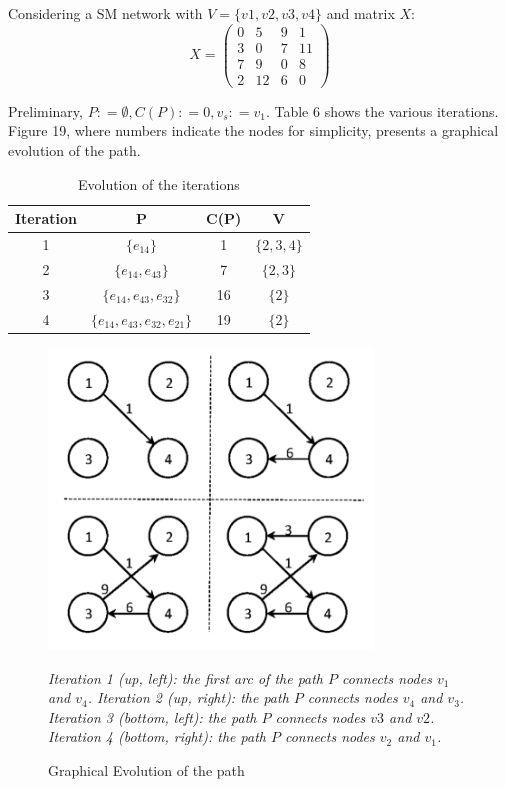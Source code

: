 Considering a SM network with $V = \{v1, v2, v3, v4\}$ and matrix $X$:
\begin{equation}
    \label{eq:x-matrix-sample-initialization}
    X = \begin{pmatrix} 0 & 5 & 9 & 1\\ 3 & 0 & 7 & 11\\ 7 & 9 & 0 & 8\\ 2 & 12 & 6 & 0 \end{pmatrix}
\end{equation}

Preliminary, $P : = \emptyset , C(P) : = 0, v_s : = v_1$. Table 6 shows the various iterations. Figure 19, where numbers indicate the nodes for simplicity, presents a graphical evolution of the path.
\begin{table}
    \centering
    \begin{tabular}{|c|c|c|c|}
        \hline
        \textbf{Iteration} & \textbf{P} & \textbf{C(P)} & \textbf{V} \\
        \hline
        1 & $\{e_{14}\}$ & 1 & $\{2,3,4\}$\\
        \hline
        2 & $\{e_{14}, e_{43}\}$ & 7 & $\{2,3\}$\\
        \hline
        3 & $\{e_{14}, e_{43}, e_{32}\}$ & 16 & $\{2\}$\\
        \hline
        4 & $\{e_{14}, e_{43}, e_{32}, e_{21}\}$ & 19 & $\{2\}$\\
        \hline
    \end{tabular}

    \caption{Evolution of the iterations}
    \label{tab:evolution-of-iterations}
\end{table}


\begin{figure}[h]
    \centering
    \includegraphics[height=8cm, keepaspectratio]{images/graphical-evolution-of-path}
    \caption{Graphical Evolution of the path}
    \label{fig:graphical-evolution-of-path}
    \small{\textit{Iteration 1 (up, left): the first arc of the path $P$ connects nodes $v_1$ and $v_4$. Iteration 2 (up, right): the path $P$ connects nodes $v_4$ and $v_3$. Iteration 3 (bottom, left): the path $P$ connects nodes $v3$ and $v2$. Iteration 4 (bottom, right): the path $P$ connects nodes $v_2$ and $v_1$.}}
\end{figure}

